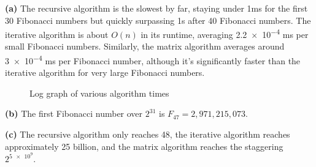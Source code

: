 \documentclass[11pt, letterpaper]{article}
\begin{document}
\begin{solution}
    \textbf{(a)} The recursive algorithm is the slowest by far, staying under 1ms for the first 30 Fibonacci numbers but quickly surpassing 1s after 40 Fibonacci numbers. The iterative algorithm is about $O(n)$ in its runtime, averaging \num{2.2e-4} ms per small Fibonacci numbers. Similarly, the matrix algorithm averages around \num{3e-4} ms per Fibonacci number, although it's significantly faster than the iterative algorithm for very large Fibonacci numbers.
    \begin{figure}[ht] 
        \centering
        \caption{Log graph of various algorithm times}
    \end{figure}

    \textbf{(b)} The first Fibonacci number over $2^{31}$ is $F_{47}=2,971,215,073$.  
    
    \textbf{(c)} The recursive algorithm only reaches 48, the iterative algorithm reaches approximately 25 billion, and the matrix algorithm reaches the staggering $2^{\num{5e9}}$.
\end{solution}
\end{document}
